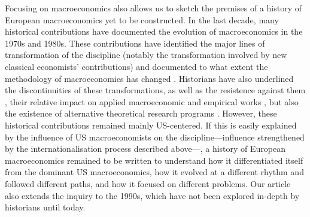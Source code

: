 \documentclass[]{elsarticle} %
\begin{document}
Focusing on macroeconomics also allows us to sketch the premises of a
history of European macroeconomics yet to be constructed. In the last
decade, many historical contributions have documented the evolution of
macroeconomics in the 1970s and 1980s. These contributions have
identified the major lines of transformation of the discipline (notably
the transformation involved by new classical economists' contributions)
and documented to what extent the methodology of macroeconomics has
changed \citep{duartelima2012a, devroey2016}. Historians have also
underlined the discontinuities of these transformations, as well as the
resistence against them
\citep{goutsmedtetal2019, goutsmedt2021b, renault2020a}, their relative
impact on applied macroeconomic and empirical works
\citep{boumans2019, qin2013a, renault2022}, but also the existence of
alternative theoretical research programs
\citep{backhouseboianovski2013, cherrier2018c, hoover2012}. However,
these historical contributions remained mainly US-centered. If this is
easily explained by the influence of US macroeconomists on the
discipline---influence strengthened by the internationalisation process
described above---, a history of European macroeconomics remained to be
written to understand how it differentiated itself from the dominant US
macroeconomics, how it evolved at a different rhythm and followed
different paths, and how it focused on different problems. Our article
also extends the inquiry to the 1990s, which have not been explored
in-depth by historians until today.
\end{document}
